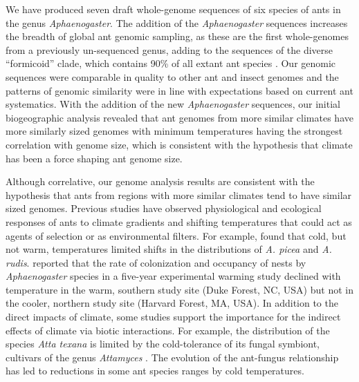 \documentclass[fleqn,10pt,lineno]{wlpeerj} %
\begin{document}
We have produced seven draft whole-genome sequences of six species of
ants in the genus \textit{Aphaenogaster}. The addition of the
\textit{Aphaenogaster} sequences increases the breadth of global ant
genomic sampling, as these are the first whole-genomes from a
previously un-sequenced genus, adding to the sequences of the diverse
``formicoid'' clade, which contains 90\% of all extant ant species
\citep{Ward2014}.  Our genomic sequences were comparable in quality to
other ant and insect genomes and the patterns of genomic similarity
were in line with expectations based on current ant systematics. With
the addition of the new \textit{Aphaenogaster} sequences, our initial
biogeographic analysis revealed that ant genomes from more similar
climates have more similarly sized genomes with minimum temperatures
having the strongest correlation with genome size, which is consistent
with the hypothesis that climate has been a force shaping ant genome
size.

Although correlative, our genome analysis results are consistent with
the hypothesis that ants from regions with more similar climates tend
to have similar sized genomes. Previous studies have observed
physiological and ecological responses of ants to climate gradients
and shifting temperatures \citep{Warren2013, Stanton-Geddes,
  Diamond2016, Nguyen2017, HelmsCahan2017, Diamond2017, Penick2017}
that could act as agents of selection or as environmental filters. For
example, \cite{Warren2013} found that cold, but not warm, temperatures
limited shifts in the distributions of \textit{A. picea} and
\textit{A. rudis}. \cite{Diamond2016} reported that the rate of
colonization and occupancy of nests by \textit{Aphaenogaster} species
in a five-year experimental warming study \citep{Pelini2014} declined
with temperature in the warm, southern study site (Duke Forest, NC,
USA) but not in the cooler, northern study site (Harvard Forest, MA,
USA). In addition to the direct impacts of climate, some studies
support the importance for the indirect effects of climate via biotic
interactions. For example, the distribution of the species
\textit{Atta texana} is limited by the cold-tolerance of its fungal
symbiont, cultivars of the genus \textit{Attamyces}
\citep{Mueller2011}. The evolution of the ant-fungus relationship has
led to reductions in some ant species ranges by cold temperatures.
\end{document}
